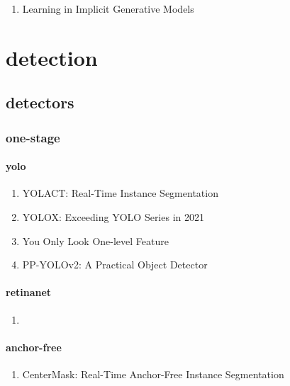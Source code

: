 \documentclass[acmlarge]{acmart}
\begin{document}
\begin{enumerate}
	\item Learning in Implicit Generative Models \cite{Mohamed2016LearningII} 

\end{enumerate}
\section{detection}
	\subsection{detectors}
		\subsubsection{one-stage}
			\paragraph{yolo}
			\begin{enumerate}
				\item YOLACT: Real-Time Instance Segmentation \cite{Bolya2019YOLACTRI} 

				\item YOLOX: Exceeding YOLO Series in 2021 \cite{Ge2021YOLOXEY} 

				\item You Only Look One-level Feature \cite{Chen2021YouOL} 

				\item PP-YOLOv2: A Practical Object Detector \cite{Huang2021PPYOLOv2AP} 

			\end{enumerate}
			\paragraph{retinanet}
			\begin{enumerate}
				\item
			\end{enumerate}
			\paragraph{anchor-free}
			\begin{enumerate}
				\item CenterMask: Real-Time Anchor-Free Instance Segmentation \cite{Lee2020CenterMaskRA} 

			\end{enumerate}
		\begin{enumerate}
		\end{enumerate}
\end{document}
